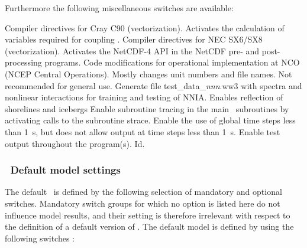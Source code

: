 \noindent
Furthermore the following miscellaneous switches are available:
\begin{slist}
 {Compiler directives for Cray C90 (vectorization).}
 {Activates the calculation of variables required for coupling}
.
 {Compiler directives for NEC SX6/SX8 (vectorization).}
 {Activates the NetCDF-4 API in the NetCDF pre- and post-processing programs.}
 {Code modifications for operational implementation at NCO
           (NCEP Central Operations). Mostly changes unit numbers
           and file names. Not recommended for general use.} 
 {Generate file test\_data\_{\it{nnn}}.ww3 with spectra and 
           nonlinear interactions for training and testing of NNIA}.
 {Enables reflection of shorelines and icebergs}
   {Enable subroutine tracing in the main \ws\
           subroutines by activating calls to the
           subroutine {\F strace}.}
   {Enable the use of global time steps less than 1~s, but does not allow output at time steps less than 1~s.}
\sit{t}   {Enable test output throughout the program(s).}
  {Id.}
\end{slist}


\vsssub
\subsubsection{~Default model settings} \label{sub:opt_default}
\vsssub
%
%
The default \ws\ is defined by the following selection of mandatory and
optional switches. Mandatory switch groups for which no option is listed here
do not influence model results, and their setting is therefore irrelevant with
respect to the definition of a default version of \ws. The default model is
defined by using the following switches :

